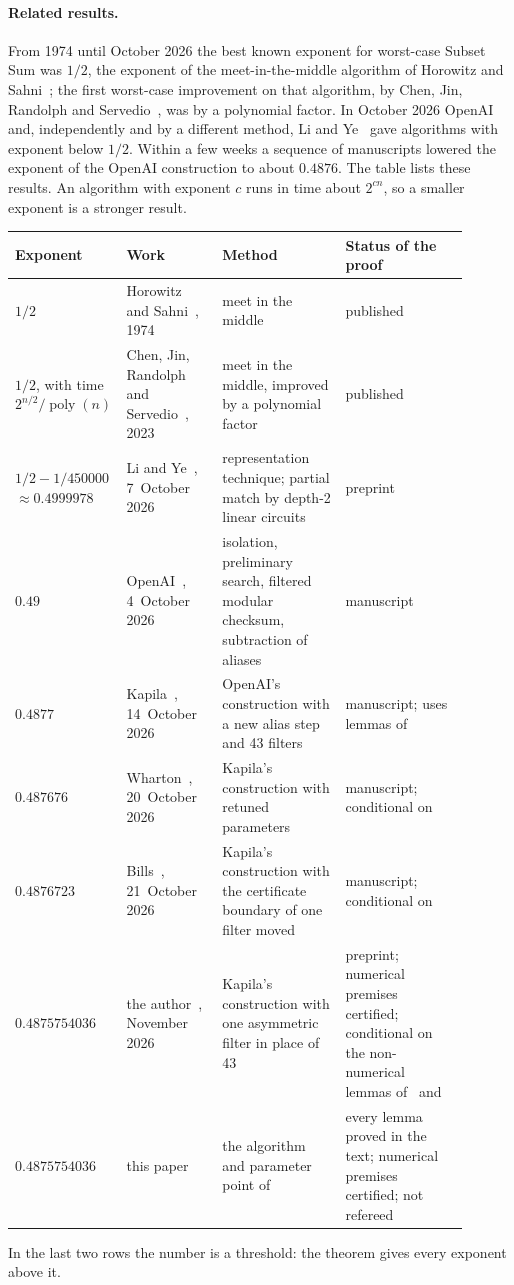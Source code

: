 \documentclass[11pt]{article}
\theoremstyle{definition}
\newcommand{\poly}{\operatorname{poly}}
\begin{document}
\paragraph{Related results.} From 1974 until October 2026 the best known exponent for worst-case Subset Sum was
$1/2$, the exponent of the meet-in-the-middle algorithm of Horowitz and Sahni~\cite{HS}; the first worst-case
improvement on that algorithm, by Chen, Jin, Randolph and Servedio~\cite{CJRS}, was by a polynomial factor. In
October 2026 OpenAI~\cite{OAI} and, independently and by a different method, Li and Ye~\cite{LY} gave algorithms
with exponent below $1/2$. Within a few weeks a sequence of manuscripts lowered the exponent of the OpenAI
construction to about $0.4876$. The table lists these results. An algorithm with exponent $c$ runs in time about
$2^{cn}$, so a smaller exponent is a stronger result.
\begin{center}
\small
\begin{tabular}{@{}>{\raggedright\arraybackslash}p{0.15\linewidth}>{\raggedright\arraybackslash}p{0.21\linewidth}%
>{\raggedright\arraybackslash}p{0.27\linewidth}>{\raggedright\arraybackslash}p{0.27\linewidth}@{}}
\toprule
Exponent & Work & Method & Status of the proof\\
\midrule
$1/2$ & Horowitz and Sahni~\cite{HS}, 1974 & meet in the middle & published\\
$1/2$, with time $2^{n/2}/\poly(n)$ & Chen, Jin, Randolph and Servedio~\cite{CJRS}, 2023 & meet in the middle,
improved by a polynomial factor & published\\
$1/2-1/450000$ $\approx0.4999978$ & Li and Ye~\cite{LY}, 7~October 2026 & representation technique; partial match
by depth-2 linear circuits & preprint\\
$0.49$ & OpenAI~\cite{OAI}, 4~October 2026 & isolation, preliminary search, filtered modular checksum, subtraction
of aliases & manuscript\\
$0.4877$ & Kapila~\cite{Base}, 14~October 2026 & OpenAI's construction with a new alias step and 43 filters & manuscript; uses
lemmas of~\cite{OAI}\\
$0.487676$ & Wharton~\cite{W}, 20~October 2026 & Kapila's construction with retuned parameters & manuscript; conditional
on~\cite{Base}\\
$0.4876723$ & Bills~\cite{B}, 21~October 2026 & Kapila's construction with the certificate boundary of one filter moved &
manuscript; conditional on~\cite{Base}\\
$0.4875754036$ & the author~\cite{V}, November 2026 & Kapila's construction with one asymmetric filter in place of 43 & preprint;
numerical premises certified; conditional on the non-numerical lemmas of~\cite{OAI} and~\cite{Base}\\
$0.4875754036$ & this paper & the algorithm and parameter point of~\cite{V} & every lemma proved in the text;
numerical premises certified; not refereed\\
\bottomrule
\end{tabular}
\end{center}
In the last two rows the number is a threshold: the theorem gives every exponent above it.
\end{document}
